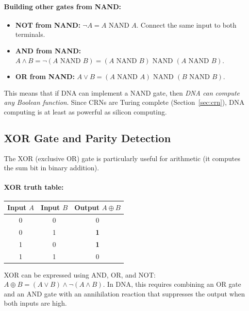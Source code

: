 \paragraph{Building other gates from NAND:}
\begin{itemize}[leftmargin=1.8em]
  \item \textbf{NOT from NAND:} $\neg A = A \text{ NAND } A$. Connect the same input to both terminals.
  \item \textbf{AND from NAND:} $A \wedge B = \neg(A \text{ NAND } B) = (A \text{ NAND } B) \text{ NAND } (A \text{ NAND } B)$.
  \item \textbf{OR from NAND:} $A \vee B = (A \text{ NAND } A) \text{ NAND } (B \text{ NAND } B)$.
\end{itemize}

This means that if DNA can implement a NAND gate, then \emph{DNA can compute any Boolean function}. Since CRNs are Turing complete (Section~\ref{sec:crn}), DNA computing is at least as powerful as silicon computing.

\subsection{XOR Gate and Parity Detection}

The XOR (exclusive OR) gate is particularly useful for arithmetic (it computes the sum bit in binary addition).

\paragraph{XOR truth table:}
\begin{center}
\renewcommand{\arraystretch}{1.15}
\begin{tabular}{cc|c}
\toprule
\textbf{Input $A$} & \textbf{Input $B$} & \textbf{Output $A \oplus B$} \\
\midrule
0 & 0 & 0 \\
0 & 1 & \textbf{1} \\
1 & 0 & \textbf{1} \\
1 & 1 & 0 \\
\bottomrule
\end{tabular}
\end{center}

XOR can be expressed using AND, OR, and NOT: $A \oplus B = (A \vee B) \wedge \neg(A \wedge B)$. In DNA, this requires combining an OR gate and an AND gate with an annihilation reaction that suppresses the output when both inputs are high.

